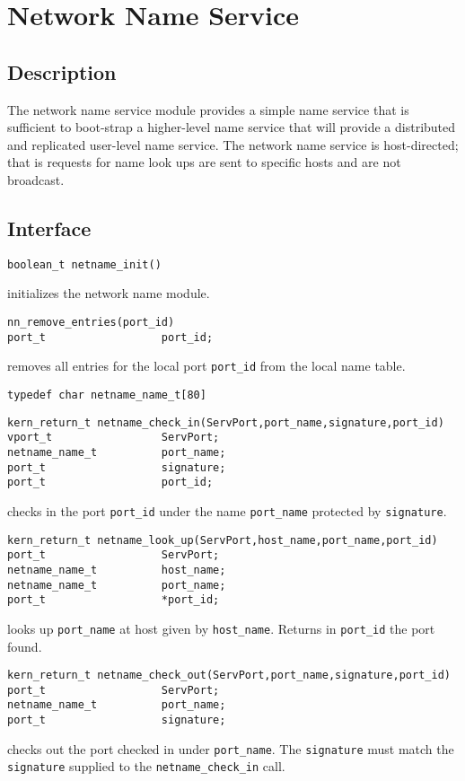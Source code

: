 \section{Network Name Service}
\subsection{Description}
The network name service module provides a simple name service that is
sufficient to boot-strap a higher-level name service that will provide a
distributed and replicated user-level name service.  The network name
service is host-directed; that is requests for name look ups are sent to
specific hosts and are not broadcast.

\subsection{Interface}
\begin{verbatim}
boolean_t netname_init()
\end{verbatim}
initializes the network name module.

\begin{verbatim}
nn_remove_entries(port_id)
port_t                  port_id;
\end{verbatim}
removes all entries for the local port \verb"port_id" from the local name
table.

\begin{verbatim}
typedef char netname_name_t[80]
\end{verbatim}

\begin{verbatim}
kern_return_t netname_check_in(ServPort,port_name,signature,port_id)
vport_t                 ServPort;
netname_name_t          port_name;
port_t                  signature;
port_t                  port_id;
\end{verbatim}
checks in the port \verb"port_id" under the name \verb"port_name" protected
by \verb"signature".

\begin{verbatim}
kern_return_t netname_look_up(ServPort,host_name,port_name,port_id)
port_t                  ServPort;
netname_name_t          host_name;
netname_name_t          port_name;
port_t                  *port_id;
\end{verbatim}
looks up \verb"port_name" at host given by \verb"host_name".  Returns in
\verb"port_id" the port found.

\begin{verbatim}
kern_return_t netname_check_out(ServPort,port_name,signature,port_id)
port_t                  ServPort;
netname_name_t          port_name;
port_t                  signature;
\end{verbatim}
checks out the port checked in under \verb"port_name".  The \verb"signature"
must match the \verb"signature" supplied to the \verb"netname_check_in"
call.

